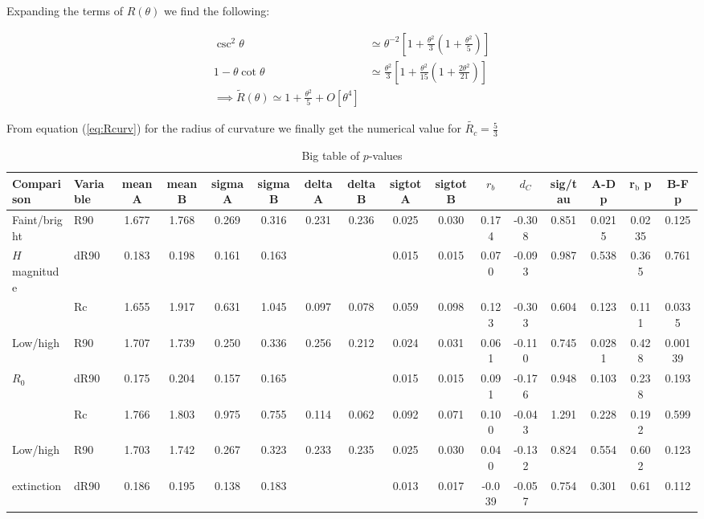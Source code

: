 Expanding the terms of $R(\theta)$ we find the following:

\begin{align}
  \csc^2\theta &\simeq \theta^{-2}\left[1+\frac{\theta^2}{3}\left(1+\frac{\theta^2}{5}\right)\right] \\
  1-\theta\cot\theta &\simeq \frac{\theta^2}{3}\left[1 + \frac{\theta^2}{15}\left(1+\frac{2\theta^2}{21}\right)\right] \\
  \implies \tilde{R}(\theta) \simeq 1 + \frac{\theta^2}{5} + O\left[\theta^4\right]
\end{align}

From equation (\ref{eq:Rcurv}) for the radius of curvature we finally get the numerical value for $\tilde{R_c} = \frac{5}{3}$
\clearpage
\begin{landscape}
\begin{table}
  \setlength\tabcolsep{1pt}
  \caption{Big table of \(p\)-values}
\begin{tabular}{llSSSSSSSSSSSSSS}\toprule
{Comparison} & {Variable} & {mean A} & {mean B} & {sigma A} & {sigma B} & {delta A} & {delta B} & {sigtot A} & {sigtot B} & {\(r_b\)} & {\(d_C\)} & {sig/tau} & {A-D p} & {r\(_{\text{b}}\) p} &  {B-F p}\\
\midrule
Faint/bright & R90 & 1.677 & 1.768 & 0.269 & 0.316 & 0.231 & 0.236 & 0.025 & 0.030 & 0.174 & -0.308 & 0.851 & 0.0215 & 0.0235 & 0.125\\
\(H\) magnitude  & dR90 & 0.183 & 0.198 & 0.161 & 0.163 &  &  & 0.015 & 0.015 & 0.070 & -0.093 & 0.987 & 0.538 & 0.365 & 0.761\\
& Rc & 1.655 & 1.917 & 0.631 & 1.045 & 0.097 & 0.078 & 0.059 & 0.098 & 0.123 & -0.303 & 0.604 & 0.123 & 0.111 & 0.0335\\
Low/high  & R90 & 1.707 & 1.739 & 0.250 & 0.336 & 0.256 & 0.212 & 0.024 & 0.031 & 0.061 & -0.110 & 0.745 & 0.0281 & 0.428 & 0.00139\\
\(R_0\) & dR90 & 0.175 & 0.204 & 0.157 & 0.165 &  &  & 0.015 & 0.015 & 0.091 & -0.176 & 0.948 & 0.103 & 0.238 & 0.193\\
& Rc & 1.766 & 1.803 & 0.975 & 0.755 & 0.114 & 0.062 & 0.092 & 0.071 & 0.100 & -0.043 & 1.291 & 0.228 & 0.192 & 0.599\\
Low/high & R90 & 1.703 & 1.742 & 0.267 & 0.323 & 0.233 & 0.235 & 0.025 & 0.030 & 0.040 & -0.132 & 0.824 & 0.554 & 0.602 & 0.123\\
extinction & dR90 & 0.186 & 0.195 & 0.138 & 0.183 &  &  & 0.013 & 0.017 & -0.039 & -0.057 & 0.754 & 0.301 & 0.61 & 0.112\\

\end{tabular}
\end{table}
\end{landscape}
